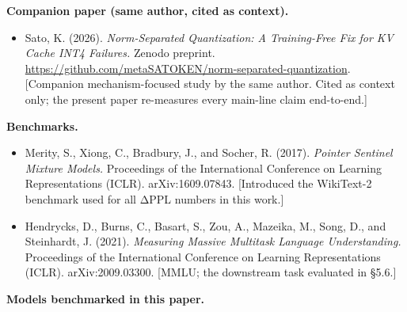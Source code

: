 \documentclass[
]{article}
\providecommand{\tightlist}{%
  \setlength{\itemsep}{0pt}\setlength{\parskip}{0pt}}
\begin{document}
\textbf{Companion paper (same author, cited as context).}

\begin{itemize}
\tightlist
\item
  Sato, K. (2026). \emph{Norm-Separated Quantization: A Training-Free
  Fix for KV Cache INT4 Failures.} Zenodo preprint.
  \url{https://github.com/metaSATOKEN/norm-separated-quantization}.
  {[}Companion mechanism-focused study by the same author. Cited as
  context only; the present paper re-measures every main-line claim
  end-to-end.{]}
\end{itemize}

\textbf{Benchmarks.}

\begin{itemize}
\tightlist
\item
  Merity, S., Xiong, C., Bradbury, J., and Socher, R. (2017).
  \emph{Pointer Sentinel Mixture Models.} Proceedings of the
  International Conference on Learning Representations (ICLR).
  arXiv:1609.07843. {[}Introduced the WikiText-2 benchmark used for all
  ΔPPL numbers in this work.{]}
\item
  Hendrycks, D., Burns, C., Basart, S., Zou, A., Mazeika, M., Song, D.,
  and Steinhardt, J. (2021). \emph{Measuring Massive Multitask Language
  Understanding.} Proceedings of the International Conference on
  Learning Representations (ICLR). arXiv:2009.03300. {[}MMLU; the
  downstream task evaluated in §5.6.{]}
\end{itemize}

\textbf{Models benchmarked in this paper.}
\end{document}
